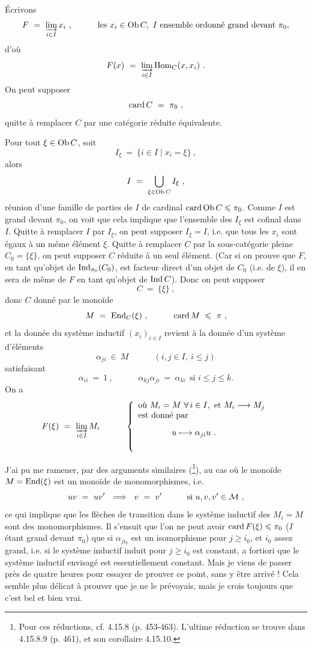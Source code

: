 Écrivons
\[
F \ = \ \varinjlim_{i\in I} x_i\ , \qquad\quad \text{les } x_i \in \operatorname{Ob} C,\ I \text{ ensemble ordonné grand devant } \pi_0,
\]
d'où
\[
F(x) \ = \ \varinjlim_{i\in I} \Hom_C(x, x_i)\ .
\]
On peut supposer
\[
\operatorname{card} C \ = \ \pi_0\ ,
\]
quitte à remplacer $C$ par une catégorie réduite équivalente.

Pour tout $\xi \in \operatorname{Ob} C$, soit
\[
I_{\xi} \ = \ \{ i \in I \mid x_i = \xi \}\ ,
\]
alors
\[
I \ = \ \bigcup_{\xi\in\operatorname{Ob} C} I_{\xi}\ ,
\]
réunion d'une famille de parties de $I$ de cardinal $\operatorname{card}\operatorname{Ob} C \leqslant \pi_0$. Comme $I$ est grand devant $\pi_0$, on voit que cela implique que l'ensemble des $I_{\xi}$ est cofinal dans $I$. Quitte à remplacer $I$ par $I_{\xi}$, on peut supposer $I_{\xi} = I$, i.e. que tous les $x_i$ sont égaux à un même élément $\xi$. Quitte à remplacer $C$ par la sous-catégorie pleine $C_0 = \{\xi\}$, on peut supposer $C$ réduite à un seul élément. (Car si on prouve que $F$, en tant qu'objet de $\operatorname{Ind}_{\pi_0}(C_0)$, est facteur direct d'un objet de $C_0$ (i.e. de $\xi$), il en sera de même de $F$ en tant qu'objet de $\operatorname{Ind} C$). Donc on peut supposer
\[
C \ = \ \{\xi\}\ ,
\]
donc $C$ donné par le monoïde
\[
M \ = \ \operatorname{End}_C(\xi)\ , \qquad\quad \operatorname{card} M \ \leqslant\ \pi\ ,
\]
et la donnée du système inductif $(x_i)_{i\in I}$ revient à la donnée d'un système d'éléments
\[
\alpha_{ji} \ \in\ M \qquad\quad (i, j \in I,\ i \leqslant j)
\]
satisfaisant
\[
\alpha_{ii} \ = \ 1\ , \qquad\quad \alpha_{kj}\alpha_{ji} \ = \ \alpha_{ki} \ \ \text{si } i \leqslant j \leqslant k.
\]
On a
\[
F(\xi) \ = \ \varinjlim_{i\in I} M_i \qquad\quad
\left\{
\begin{array}{l}
\text{où } M_i = M \ \forall\, i \in I, \text{ et } M_i \longrightarrow M_j \\
\text{est donné par} \\[2ex]
\qquad\qquad u \longmapsto \alpha_{ji}u\ . \\[4ex]
\end{array}
\right.
\]


J'ai pu me ramener, par des arguments similaires (\footnote[92]{Pour ces réductions, cf. 4.15.8 (p. 453-463). L'ultime réduction se trouve dans 4.15.8.9 (p. 461), et son corollaire 4.15.10.}), au cas où le monoïde $M = \operatorname{End}(\xi)$ est un monoïde de monomorphismes, i.e.
\[
uv \ = \ uv' \ \ \Longrightarrow\ \ v \ = \ v' \qquad\quad \text{si } u, v, v' \in \cM\ ,
\] %
ce qui implique que les flèches de transition dans le système inductif des $M_i = M$ sont des monomorphismes. Il s'ensuit que l'on ne peut avoir $\operatorname{card} F(\xi) \leqslant \pi_0$ ($I$ étant grand devant $\pi_0$) que si $\alpha_{ji_0}$ est un isomorphisme pour $j \geqslant i_0$, et $i_0$ assez grand, i.e. si le système inductif induit pour $j \geqslant i_0$ est constant, a fortiori que le système inductif envisagé est essentiellement constant. Mais je viens de passer près de quatre heures pour essayer de prouver ce point, sans y être arrivé ! Cela semble plus délicat à prouver que je ne le prévoyais, mais je crois toujours que c'est bel et bien vrai.

